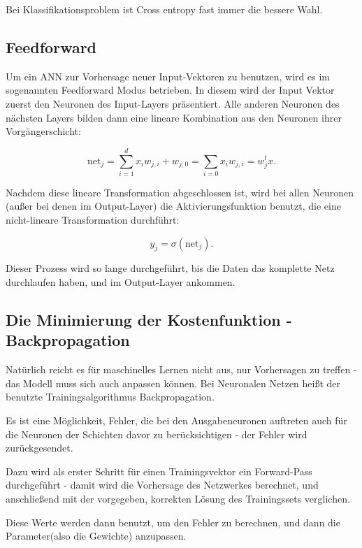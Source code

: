 Bei Klassifikationsproblem ist Cross entropy fast immer die bessere Wahl. 


\subsection{Feedforward}
Um ein ANN zur Vorhersage neuer Input-Vektoren zu benutzen, wird es im sogenannten Feedforward Modus betrieben. In diesem wird der Input Vektor zuerst den Neuronen des Input-Layers präsentiert. Alle anderen Neuronen des nächsten Layers bilden dann eine lineare Kombination aus den Neuronen ihrer Vorgängerschicht: 

\begin{equation}
\text{net}_j = \sum_{i=1}^d x_i w_{j,i} + w_{j,0} = \sum_{i=0} x_i w_{j,i} = 
w_j^t x.
\end{equation}

Nachdem diese lineare Transformation abgeschlossen ist, wird bei allen Neuronen (außer bei denen im Output-Layer) die Aktivierungsfunktion benutzt, die eine nicht-lineare Transformation durchführt: 

\begin{equation}
y_j = \sigma (\text{net}_j).
\end{equation}

Dieser Prozess wird so lange durchgeführt, bis die Daten das komplette Netz durchlaufen haben, und im Output-Layer ankommen.

\cite{duda2012pattern}

\subsection{Die Minimierung der Kostenfunktion - Backpropagation}

Natürlich reicht es für maschinelles Lernen nicht aus, nur Vorhersagen zu treffen - das Modell muss sich auch anpassen können. Bei Neuronalen Netzen heißt der benutzte Trainingsalgorithmus Backpropagation.

Es ist eine Möglichkeit, Fehler, die bei den Ausgabeneuronen auftreten auch für die Neuronen der Schichten davor zu berücksichtigen - der Fehler wird zurückgesendet.

Dazu wird als erster Schritt für einen Trainingsvektor ein Forward-Pass durchgeführt - damit wird die Vorhersage des Netzwerkes berechnet, und anschließend mit der vorgegeben, korrekten Lösung des Trainingssets verglichen.

Diese Werte werden dann benutzt, um den Fehler zu berechnen, und dann die Parameter(also die Gewichte) anzupassen.


